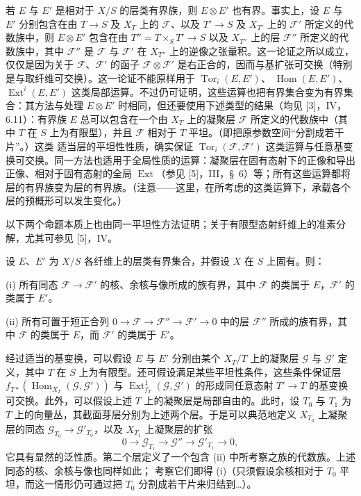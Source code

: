 若 $E$ 与 $E'$ 是相对于 $X/S$ 的层类有界族，则
$E\otimes E'$ 也有界。事实上，设 $E$ 与 $E'$ 分别包含在由
$T\longrightarrow S$ 及 $X_T$ 上的 $\mathcal F$、以及
$T'\longrightarrow S$ 及 $X_{T'}$ 上的 $\mathcal F'$ 所定义的代数族中，则 $E\otimes E'$ 包含在由
$T''=T\times_S T'\longrightarrow S$ 以及 $X_{T''}$ 上的层
$\mathcal F''$ 所定义的代数族中，其中 $\mathcal F''$ 是
$\mathcal F$ 与 $\mathcal F'$ 在 $X_{T''}$ 上的逆像之张量积。这一论证之所以成立，仅仅是因为关于 $\mathcal F$、$\mathcal F'$ 的函子
$\mathcal F\otimes\mathcal F'$ 是右正合的，因而与基扩张可交换（特别是与取纤维可交换）。这一论证不能原样用于
$\operatorname{Tor}_i(E,E')$、
$\operatorname{Hom}(E,E')$、
$\operatorname{Ext}^i(E,E')$ 这类局部运算。不过仍可证明，这些运算也把有界集合变为有界集合：其方法与处理
$E\otimes E'$ 时相同，但还要使用下述类型的结果（均见 [3]，IV，6.11）：有界族 $E$ 总可以包含在一个由 $X_T$ 上的凝聚层
$\mathcal F$ 所定义的代数族中（其中 $T$ 在 $S$ 上为有限型），并且
$\mathcal F$ 相对于 $T$ 平坦。（即把原参数空间“分割成若干片”。）这类
适当层的平坦性性质，确实保证
$\operatorname{Tor}_i(\mathcal F,\mathcal F')$ 这类运算与任意基变换可交换。同一方法也适用于全局性质的运算：凝聚层在固有态射下的正像和导出正像、相对于固有态射的全局
$\operatorname{Ext}$（参见 [5]，III，\S~6）等；所有这些运算都将层的有界族变为层的有界族。（注意——这里，在所考虑的这类运算下，承载各个层的预概形可以发生变化。）

以下两个命题本质上也由同一平坦性方法证明；关于有限型态射纤维上的准素分解，尤其可参见 [5]，IV。

 设 $E$、$E'$ 为 $X/S$ 各纤维上的层类有界集合，并假设 $X$ 在 $S$ 上固有。则：

\medskip
\noindent (i) 所有同态
$\mathcal F\longrightarrow\mathcal F'$ 的核、余核与像所成的族有界，其中 $\mathcal F$ 的类属于 $E$，$\mathcal F'$ 的类属于 $E'$。

\smallskip
\noindent (ii) 所有可置于短正合列
$0\longrightarrow\mathcal F\longrightarrow\mathcal F''
\longrightarrow\mathcal F'\longrightarrow0$
中的层 $\mathcal F''$ 所成的族有界，其中 $\mathcal F$ 的类属于
$E$，而 $\mathcal F'$ 的类属于 $E'$。

经过适当的基变换，可以假设 $E$ 与 $E'$ 分别由某个
$X_T/T$ 上的凝聚层 $\mathcal G$ 与 $\mathcal G'$ 定义，其中 $T$ 在
$S$ 上为有限型。还可假设满足某些平坦性条件，这些条件保证层
$f_{T*}(\operatorname{Hom}_{X_T}(\mathcal G,\mathcal G'))$ 与
$\operatorname{Ext}^{1}_{f_T}(\mathcal G,\mathcal G')$ 的形成同任意态射
$T'\longrightarrow T$ 的基变换可交换。此外，可以假设上述 $T$ 上的凝聚层是局部自由的。此时，设 $T_0$ 与 $T_1$ 为 $T$ 上的向量丛，其截面芽层分别为上述两个层。于是可以典范地定义
$X_{T_0}$ 上凝聚层的同态
$\mathcal G_{T_0}\longrightarrow\mathcal G'_{T_0}$，以及
$X_{T_1}$ 上凝聚层的扩张
\[
0\longrightarrow\mathcal G_{T_1}\longrightarrow\mathcal G''
\longrightarrow\mathcal G'_{T_1}\longrightarrow0,
\]
它具有显然的泛性质。第二个层定义了一个包含 (ii) 中所考察之族的代数族。上述同态的核、余核与像也同样如此；
考察它们即得 (i)（只须假设余核相对于 $T_0$ 平坦，而这一情形仍可通过把 $T_0$ 分割成若干片来归结到\ldots）。

